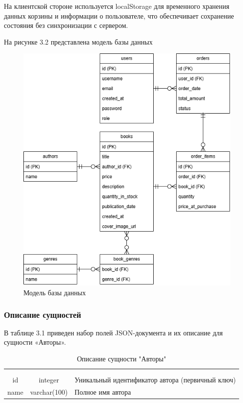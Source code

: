 На клиентской стороне используется localStorage для временного хранения данных корзины и информации о пользователе, что обеспечивает сохранение состояния без синхронизации с сервером.

На рисунке 3.2 представлена модель базы данных

\begin{figure}[H]
	\centering
	\includegraphics[width=0.7\linewidth]{images/концептуальная_модель}
	\caption{Модель базы данных}
	\label{fig:}
\end{figure}


\subsubsection{Описание сущностей}

 В таблице 3.1 приведен набор полей JSON-документа и их описание для сущности «Авторы».

\begin{xltabular}{\textwidth}{|c|c|X|}
	\caption{Описание сущности "Авторы"\label{authors:table}}\\ \hline
	 &  &  \\ \hline
	\endfirsthead
	\\ \hline
	 &  &  \\ \hline
	\endhead
	id & integer & Уникальный идентификатор автора (первичный ключ) \\ \hline
	name & varchar(100) & Полное имя автора \\ \hline
\end{xltabular}


